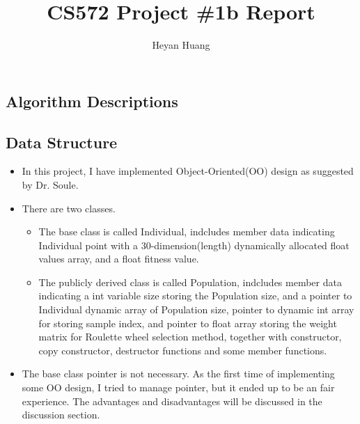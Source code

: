 \documentclass{article}
\title{CS572 Project \#1b Report}
\author{Heyan Huang}
\begin{document}
\begin{CJK}{UTF8}{gbsn}
\maketitle


\lstset{language=c++,
numbers=left, 
numberstyle=\tiny, 
escapeinside=``, 
extendedchars=false %
}


\section{Algorithm Descriptions}

\subsection{Data Structure}
\begin{itemize}
  \itemsep=-3pt
\item In this project, I have implemented Object-Oriented(OO) design as suggested by Dr. Soule. 

\item There are two classes. 
  \begin{itemize}
    \itemsep=-3pt

  \item The base class is called Individual, indcludes member data indicating Individual point with a 30-dimension(length) dynamically allocated float values array, and a float fitness value.
  \item The publicly derived class is called Population, indcludes member data indicating a int variable size storing the Population size, and a pointer to Individual dynamic array of Population size, pointer to dynamic int array for storing sample index, and pointer to float array storing the weight matrix for Roulette wheel selection method, together with constructor, copy constructor, destructor functions and some member functions.
  \end{itemize}

\item The base class pointer is not necessary. As the first time of implementing some OO design, I tried to manage pointer, but it ended up to be an fair experience. The advantages and disadvantages will be discussed in the discussion section. 
\end{itemize}



\end{CJK}
\end{document}
